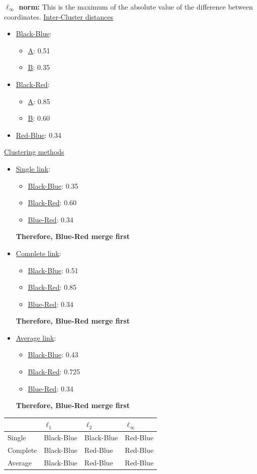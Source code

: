\documentclass[submit]{harvardml}
\begin{document}
\noindent\textbf{$\ell_{\infty}$ norm:}	This is the maximum of the absolute value of the difference between coordinates. 
	\underline{Inter-Cluster distances}
	\begin{itemize}
		\item \underline{Black-Blue}:
			\begin{itemize}
				\item \underline{A}: 0.51
				\item \underline{B}: 0.35
			\end{itemize} 
		\item \underline{Black-Red}:  
			\begin{itemize}
				\item \underline{A}: 0.85
				\item \underline{B}: 0.60
			\end{itemize}
		\item \underline{Red-Blue}: 0.34
	\end{itemize}
	\underline{Clustering methods}
	\begin{itemize}	
		\item \underline{Single link}:
			\begin{itemize}
				\item \underline{Black-Blue}: 0.35
				\item \underline{Black-Red}: 0.60
				\item \underline{Blue-Red}: 0.34
			\end{itemize}		
		\textbf{Therefore, Blue-Red merge first}	
		\item \underline{Complete link}:
			\begin{itemize}
				\item \underline{Black-Blue}: 0.51
				\item \underline{Black-Red}:  0.85
				\item \underline{Blue-Red}: 0.34
			\end{itemize}		
		\textbf{Therefore, Blue-Red merge first}	
		\item \underline{Average link}:
			\begin{itemize}
				\item \underline{Black-Blue}: 0.43
				\item \underline{Black-Red}: 0.725
				\item \underline{Blue-Red}: 0.34
			\end{itemize}			
		\textbf{Therefore, Blue-Red merge first}	
	\end{itemize}
\begin{table}[hbt]
\centering
\begin{tabular}{|l|l|l|l|}
\hline
         & $\ell_1$   & $\ell_2$   & $\ell_{\infty}$ \\ \hline
Single   & Black-Blue & Black-Blue & Red-Blue        \\ \hline
Complete & Black-Blue & Red-Blue   & Red-Blue        \\ \hline
Average  & Black-Blue & Red-Blue   & Red-Blue        \\ \hline
\end{tabular}
\end{table}
\end{document}

